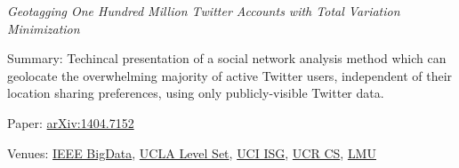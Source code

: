 \documentclass[margin,line]{res}
\newenvironment{list1}{
  \begin{list}{\ding{113}}{%
      \setlength{\itemsep}{0in}
      \setlength{\parsep}{0in} \setlength{\parskip}{0in}
      \setlength{\topsep}{0in} \setlength{\partopsep}{0in} 
      \setlength{\leftmargin}{0.17in}}}{\end{list}}
\begin{document}
\begin{resume}
{\it Geotagging One Hundred Million Twitter Accounts with Total Variation Minimization} 
\begin{list1}
\item [] Summary: Techincal presentation of a social network analysis method which can geolocate the overwhelming majority of active Twitter users, independent of their location sharing preferences, using only publicly-visible Twitter data.
\item [] Paper: \href{https://arxiv.org/abs/1404.7152}{arXiv:1404.7152}
\item [] Venues: \href{http://cci.drexel.edu/bigdata/bigdata2014/}{IEEE BigData}, \href{http://papyrus.math.ucla.edu/seminars/display.php?&id=831425}{UCLA Level Set}, \href{http://calendar.ics.uci.edu/event.php?calendar=1&category=&event=1386&date=2015-01-16}{UCI ISG}, \href{http://wwwcontent.cs.ucr.edu/department/eventlookup/491}{UCR CS}, \href{http://myweb.lmu.edu/yma/LMUMathSeminar.htm}{LMU}
\end{list1}

\end{resume}
\end{document}
